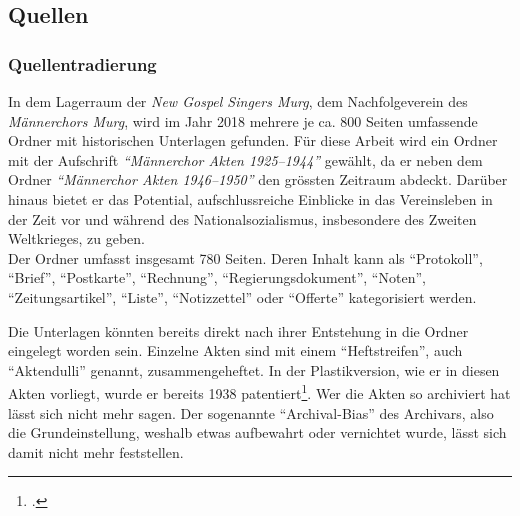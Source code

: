 \documentclass[12pt, a4paper, ngerman, bidi=default]{article}
\let\cite\footcite
\begin{document}
\subsection{Quellen}
\subsubsection{Quellentradierung}
In dem Lagerraum der \textit{New Gospel Singers Murg}, dem Nachfolgeverein des \textit{Männerchors Murg}, 
wird im Jahr 2018 mehrere je ca. 800 Seiten umfassende Ordner mit historischen Unterlagen gefunden. 
Für diese Arbeit wird ein Ordner mit der Aufschrift \textit{\enquote{Männerchor Akten 1925--1944}} gewählt, da er neben dem Ordner 
\textit{\enquote{Männerchor Akten 1946--1950}} den grössten Zeitraum abdeckt. Darüber hinaus bietet er das Potential, 
aufschlussreiche Einblicke in das Vereinsleben in der Zeit vor und während des Nationalsozialismus, insbesondere des Zweiten Weltkrieges, zu geben.\\ 
Der Ordner umfasst insgesamt 780 Seiten. Deren Inhalt kann als \enquote{Protokoll}, \enquote{Brief}, \enquote{Postkarte}, \enquote{Rechnung}, 
\enquote{Regierungsdokument}, \enquote{Noten}, \enquote{Zeitungsartikel}, \enquote{Liste}, \enquote{Notizzettel} oder \enquote{Offerte} kategorisiert werden.

Die Unterlagen könnten bereits direkt nach ihrer Entstehung in die Ordner eingelegt worden sein. Einzelne Akten sind mit einem 
\enquote{Heftstreifen}, auch \enquote{Aktendulli} genannt, zusammengeheftet. In der Plastikversion, wie er in diesen Akten vorliegt, wurde er bereits 1938 patentiert\cite[vgl.][]{noauthor_heftstreifen_2023}.
Wer die Akten so archiviert hat lässt sich nicht mehr sagen. 
Der sogenannte \enquote{Archival-Bias} des Archivars, also die Grundeinstellung, weshalb etwas aufbewahrt oder
vernichtet wurde, lässt sich damit nicht mehr feststellen. 
\end{document}
